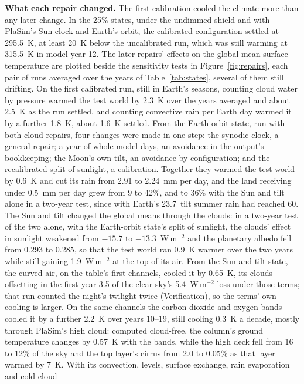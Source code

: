 \textbf{What each repair changed.} The first calibration cooled the climate more than any later change. In
the 25\% states, under the undimmed shield and with PlaSim's Sun clock and Earth's orbit, the
calibrated configuration settled at 295.5~K, at least 20~K below the uncalibrated run, which was still warming at
315.5~K in model year 12. The later repairs' effects on the
global-mean surface temperature are plotted beside the sensitivity tests in Figure~\ref{fig:repairs}, each pair of
runs averaged over the years of Table~\ref{tab:states}, several of them still drifting. On the first calibrated
run, still in Earth's seasons, counting cloud water by pressure warmed the test world by 2.3~K over the years
averaged and about 2.5~K as the run settled, and counting convective rain per Earth day warmed it by a further
1.8~K, about 1.6~K settled. From the Earth-orbit state, run with both cloud repairs, four changes
were made in one step: the synodic
clock, a general repair; a year of whole model days, an avoidance in the output's bookkeeping; the Moon's own tilt,
an avoidance by configuration; and the recalibrated split of sunlight, a calibration. Together they warmed the test
world by 0.6~K and cut its rain from 2.91 to 2.24~mm per day, and the land receiving under 0.5~mm per day grew from
9 to 42\%, and to 36\% with the Sun and tilt alone in a two-year test, since with Earth's 23.7\textdegree\ tilt
summer rain had reached 60\textdegree. The Sun and tilt changed the global means through the clouds: in a
two-year test of the two alone, with the Earth-orbit state's split of sunlight, the clouds' effect in sunlight
weakened from $-15.7$ to $-13.3$~W\,m$^{-2}$ and the planetary albedo fell from 0.293 to 0.285, so that the test
world ran 0.9~K warmer over the two years while still gaining 1.9~W\,m$^{-2}$ at the top of its air.
From the Sun-and-tilt state, the curved air, on the table's first channels, cooled it by 0.65~K, its clouds
offsetting in the first year 3.5 of the clear sky's 5.4~W\,m$^{-2}$ loss under those terms; that run counted the
night's twilight twice (Verification), so the terms' own cooling is larger. On the same channels
the carbon dioxide and oxygen bands cooled it by a further 2.2~K over years 10--19, still cooling 0.3~K a decade,
mostly through PlaSim's high cloud: computed cloud-free, the column's ground temperature changes by 0.57~K with the bands, while the
high deck fell from 16 to 12\% of the sky and the top layer's cirrus from 2.0 to 0.05\% as that layer warmed by
7~K. With its convection, levels, surface exchange, rain evaporation and cold cloud
